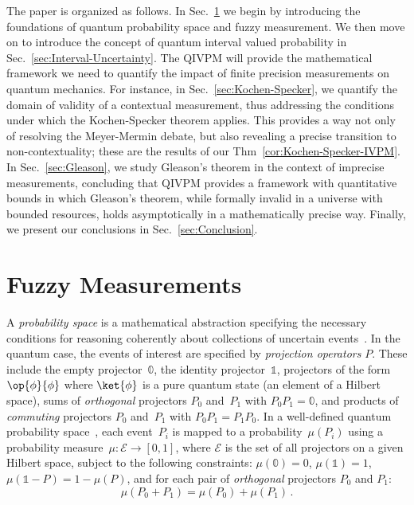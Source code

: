 \documentclass[english,reprint, aps, prl,superscriptaddress, showpacs,
showkeys, longbibliography, amsmath, amssymb]{revtex4-1}
\theoremstyle{plain}
\theoremstyle{definition}
\newcommand{\events}{\ensuremath{\mathcal{E}}}
\newcommand{\proj}[1]{\op{#1}{#1}}
\begin{document}
The paper is organized as follows.  In Sec.\ \ref{sec:fuzzy} we begin
by introducing the foundations of quantum probability space and fuzzy
measurement.  We then move on to introduce the concept of quantum
interval valued probability in Sec.\ \ref{sec:Interval-Uncertainty}.
The QIVPM will provide the mathematical framework we need to quantify the
impact of finite precision measurements on quantum mechanics.  For
instance, in Sec.\ \ref{sec:Kochen-Specker}, we quantify the domain of
validity of a contextual measurement, thus addressing the conditions
under which the Kochen-Specker theorem applies.  This provides a way
not only of resolving the Meyer-Mermin debate, but also revealing a
precise transition to non-contextuality;  these are the results of our
Thm~\ref{cor:Kochen-Specker-IVPM}.  In Sec.\ \ref{sec:Gleason}, we
study Gleason's theorem in the context of imprecise measurements,
concluding that QIVPM provides a framework with quantitative bounds in
which Gleason's theorem, while formally invalid in a universe with
bounded resources, holds asymptotically in a mathematically precise
way.  Finally, we present our conclusions in Sec.~\ref{sec:Conclusion}.

\section{Fuzzy Measurements}
\label{sec:fuzzy}

A \emph{probability space} is a mathematical abstraction specifying
the necessary conditions for reasoning coherently about collections of
uncertain
events~\cite{Kolmogorov1950,544199,Griffiths2003,Grabisch2016}. In the
quantum case, the events of interest are specified by \emph{projection
  operators} $P$. These include the empty projector~$\mathbb{0}$,
the identity projector~$\mathbb{1}$, projectors of the form
$\proj{\phi}$ where $\ket{\phi}$ is a pure quantum state (an element
of a Hilbert space), sums of \emph{orthogonal} projectors $P_0$
and~$P_1$ with $P_0P_1=\mathbb{0}$, and products of \emph{commuting}
projectors $P_0$ and~$P_1$ with $P_0P_1=P_1P_0$. In a well-defined
quantum probability
space~\cite{10.2307/2308516,gleason1957,Redhead1987-REDINA,Maassen2010},
each event~$P_{i}$ is mapped to a probability~$\mu(P_{i})$ using a
probability measure~$\mu:\events\rightarrow[0,1]$, where $\events$
is the set of all projectors on a given Hilbert space, subject to the
following constraints: $\mu(\mathbb{0})=0$, $\mu(\mathbb{1})=1$,
$\mu\left(\mathbb{1}-P\right)=1-\mu\left(P\right)$, and for each pair
of \emph{orthogonal} projectors $P_{0}$ and $P_{1}$:
\begin{equation}
{\mu}\left(P_{0}+P_{1}\right)={\mu}\left(P_{0}\right)+{\mu}\left(P_{1}\right)\,.\label{eq:QuantumProbability-Addition}
\end{equation}
\end{document}
